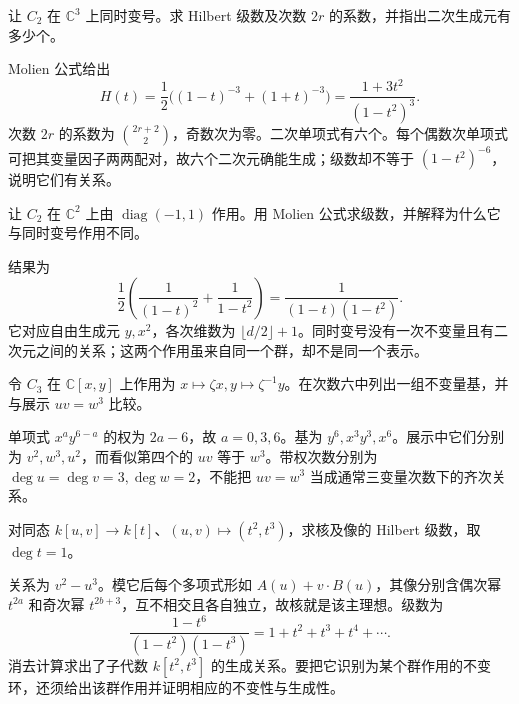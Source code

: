 \begin{optionalexercise}\label{b5:ex:22-molien-scalar-three}
	让 \(C_2\) 在 \(\mathbb C^3\) 上同时变号。求 Hilbert 级数及次数 \(2r\) 的系数，并指出二次生成元有多少个。
\end{optionalexercise}
\begin{solution}
	Molien 公式给出
	\[
		H(t)=\frac12\bigl((1-t)^{-3}+(1+t)^{-3}\bigr) =\frac{1+3t^2}{(1-t^2)^3}.
	\]
	次数 \(2r\) 的系数为 \(\binom{2r+2}{2}\)，奇数次为零。二次单项式有六个。每个偶数次单项式可把其变量因子两两配对，故六个二次元确能生成；级数却不等于 \((1-t^2)^{-6}\)，说明它们有关系。
\end{solution}

\begin{optionalexercise}\label{b5:ex:22-molien-reflection}
	让 \(C_2\) 在 \(\mathbb C^2\) 上由 \(\operatorname{diag}(-1,1)\) 作用。用 Molien 公式求级数，并解释为什么它与同时变号作用不同。
\end{optionalexercise}
\begin{solution}
	结果为
	\[
		\frac12\left(\frac1{(1-t)^2}+\frac1{1-t^2}\right) =\frac1{(1-t)(1-t^2)}.
	\]
	它对应自由生成元 \(y,x^2\)，各次维数为 \(\lfloor d/2\rfloor+1\)。同时变号没有一次不变量且有二次元之间的关系；这两个作用虽来自同一个群，却不是同一个表示。
\end{solution}

\begin{optionalexercise}\label{b5:ex:22-cubic-cyclic}
	令 \(C_3\) 在 \(\mathbb C[x,y]\) 上作用为 \(x\mapsto\zeta x,y\mapsto\zeta^{-1}y\)。在次数六中列出一组不变量基，并与展示 \(uv=w^3\) 比较。
\end{optionalexercise}
\begin{solution}
	单项式 \(x^ay^{6-a}\) 的权为 \(2a-6\)，故 \(a=0,3,6\)。基为 \(y^6,x^3y^3,x^6\)。展示中它们分别为 \(v^2,w^3,u^2\)，而看似第四个的 \(uv\) 等于 \(w^3\)。带权次数分别为 \(\deg u=\deg v=3,\deg w=2\)，不能把 \(uv=w^3\) 当成通常三变量次数下的齐次关系。
\end{solution}

\begin{optionalexercise}\label{b5:ex:22-cusp-elimination}
	对同态 \(k[u,v]\to k[t]\)、\((u,v)\mapsto(t^2,t^3)\)，求核及像的 Hilbert 级数，取 \(\deg t=1\)。
\end{optionalexercise}
\begin{solution}
	关系为 \(v^2-u^3\)。模它后每个多项式形如 \(A(u)+v\cdot B(u)\)，其像分别含偶次幂 \(t^{2a}\) 和奇次幂 \(t^{2b+3}\)，互不相交且各自独立，故核就是该主理想。级数为
	\[
		\frac{1-t^6}{(1-t^2)(1-t^3)} =1+t^2+t^3+t^4+\cdots.
	\]
	消去计算求出了子代数 \(k[t^2,t^3]\) 的生成关系。要把它识别为某个群作用的不变环，还须给出该群作用并证明相应的不变性与生成性。
\end{solution}

